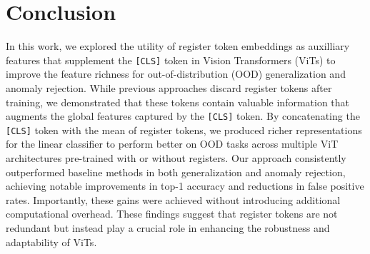 \section{Conclusion}
In this work, we explored the utility of register token embeddings as auxilliary features that supplement the \texttt{[CLS]} token in Vision Transformers (ViTs) to improve the feature richness for out-of-distribution (OOD) generalization and anomaly rejection. While previous approaches discard register tokens after training, we demonstrated that these tokens contain valuable information that augments the global features captured by the \texttt{[CLS]} token. By concatenating the \texttt{[CLS]} token with the mean of register tokens, we produced richer representations for the linear classifier to perform better on OOD tasks across multiple ViT architectures pre-trained with or without registers. Our approach consistently outperformed baseline methods in both generalization and anomaly rejection, achieving notable improvements in top-1 accuracy and reductions in false positive rates. Importantly, these gains were achieved without introducing additional computational overhead. These findings suggest that register tokens are not redundant but instead play a crucial role in enhancing the robustness and adaptability of ViTs. 
